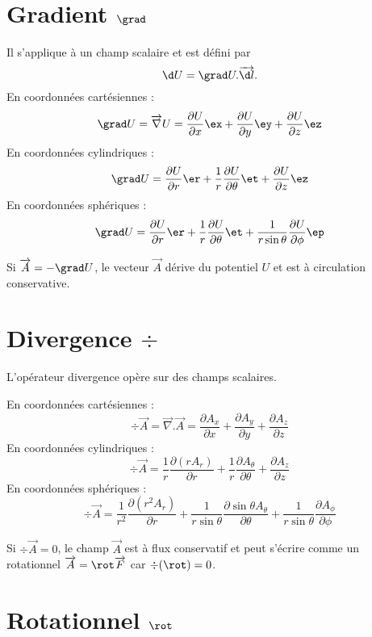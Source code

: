 \section*{Gradient $\grad$}

Il s'applique à un champ scalaire et est défini par
\begin{equation*}
\d U = \grad U.\overrightarrow{\d l}.
\end{equation*}
En coordonnées cartésiennes :
\begin{equation*}
\grad U = \overrightarrow{\nabla} U = \frac{\partial U}{\partial x}\ex + \frac{\partial U}{\partial y}\ey + \frac{\partial U}{\partial z}\ez
\end{equation*}
En coordonnées cylindriques :
\begin{equation*}
\grad U = \frac{\partial U}{\partial r}\er + \frac{1}{r}\frac{\partial U}{\partial \theta}\et + \frac{\partial U}{\partial z}\ez
\end{equation*}
En coordonnées sphériques :
\begin{equation*}
\grad U = \frac{\partial U}{\partial r}\er + \frac{1}{r}\frac{\partial U}{\partial \theta}\et + \frac{1}{r\sin\theta}\frac{\partial U}{\partial \phi}\ep
\end{equation*}

\begin{remarque}
Si $\overrightarrow{A} = -\grad U$, le vecteur $\overrightarrow{A}$ dérive du potentiel $U$ et est à circulation conservative.
\end{remarque}

\section*{Divergence $\div$}

L'opérateur divergence opère sur des champs scalaires.

En coordonnées cartésiennes :
\begin{equation*}
\div\overrightarrow{A} = \overrightarrow{\nabla}.\overrightarrow{A} = \frac{\partial A_x}{\partial x} + \frac{\partial A_y}{\partial y} + \frac{\partial A_z}{\partial z}
\end{equation*}
En coordonnées cylindriques :
\begin{equation*}
\div\overrightarrow{A} = \frac{1}{r}\frac{\partial (rA_r)}{\partial r} + \frac{1}{r}\frac{\partial A_\theta}{\partial \theta} + \frac{\partial A_z}{\partial z}
\end{equation*}
En coordonnées sphériques :
\begin{equation*}
\div\overrightarrow{A} = \frac{1}{r^2}\frac{\partial (r^2A_r)}{\partial r} + \frac{1}{r\sin\theta}\frac{\partial \sin\theta A_\theta}{\partial \theta} + \frac{1}{r\sin\theta}\frac{\partial A_\phi}{\partial \phi}
\end{equation*}

\begin{remarque}
Si $\div \overrightarrow{A} = 0$, le champ $\overrightarrow{A}$ est à flux conservatif et peut s'écrire comme un rotationnel $\overrightarrow{A} = \rot\overrightarrow{F}$ car $\div(\rot) = 0$.
\end{remarque}

\section*{Rotationnel $\rot$}
